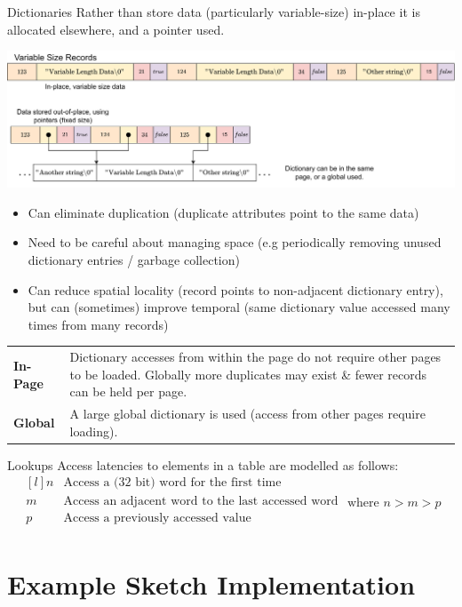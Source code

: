 \begin{definitionbox}{Dictionaries}
    Rather than store data (particularly variable-size) in-place it is allocated elsewhere, and a pointer used.
    \begin{center}
        \includegraphics[width=\textwidth]{storage/images/dictionary_layout.drawio.png}
    \end{center}
    \begin{itemize}
        \item Can eliminate duplication (duplicate attributes point to the same data)
        \item Need to be careful about managing space (e.g periodically removing unused dictionary entries / garbage collection)
        \item Can reduce spatial locality (record points to non-adjacent dictionary entry), but can (sometimes) improve temporal (same dictionary value accessed many times from many records) 
    \end{itemize}
    \begin{center}
        \begin{tabular}{l p{}}
            \textbf{In-Page} & Dictionary accesses from within the page do not require other pages to be loaded. Globally more duplicates may exist \& fewer records can be held per page. \\
            \textbf{Global} & A large global dictionary is used (access from other pages require loading). \\
        \end{tabular}
    \end{center}
\end{definitionbox}

\begin{examplebox}{Lookups}
    Access latencies to elements in a table are modelled as follows:
    \[\begin{matrix*}[l]
        n & \text{Access a (32 bit) word for the first time} \\
        m & \text{Access an adjacent word to the last accessed word} \\
        p & \text{Access a previously accessed value} \\
    \end{matrix*} \text{ where } n > m > p\]
    \unfinished
\end{examplebox}

\section{Example Sketch Implementation}
\unfinished


